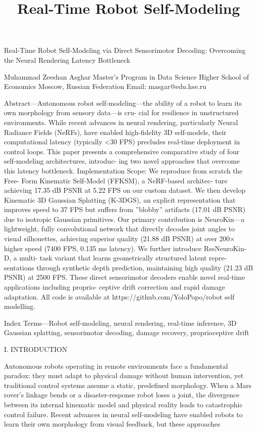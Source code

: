 \documentclass[10pt,twocolumn,letterpaper]{article}
\begin{document}
\title{Real-Time Robot Self-Modeling}
\maketitle

Real-Time Robot Self-Modeling via Direct Sensorimotor Decoding: Overcoming the Neural Rendering Latency Bottleneck

Muhammad Zeeshan Asghar Master’s Program in Data Science Higher School of Economics Moscow, Russian Federation Email: masgar@edu.hse.ru

Abstract—Autonomous robot self-modeling—the ability of a robot to learn its own morphology from sensory data—is cru- cial for resilience in unstructured environments. While recent advances in neural rendering, particularly Neural Radiance Fields (NeRFs), have enabled high-fidelity 3D self-models, their computational latency (typically <30 FPS) precludes real-time deployment in control loops. This paper presents a comprehensive comparative study of four self-modeling architectures, introduc- ing two novel approaches that overcome this latency bottleneck. Implementation Scope: We reproduce from scratch the Free- Form Kinematic Self-Model (FFKSM), a NeRF-based architec- ture achieving 17.35 dB PSNR at 5.22 FPS on our custom dataset. We then develop Kinematic 3D Gaussian Splatting (K-3DGS), an explicit representation that improves speed to 37 FPS but suffers from ”blobby” artifacts (17.01 dB PSNR) due to isotropic Gaussian primitives. Our primary contribution is NeuroKin—a lightweight, fully convolutional network that directly decodes joint angles to visual silhouettes, achieving superior quality (21.88 dB PSNR) at over 200× higher speed (7400 FPS, 0.135 ms latency). We further introduce ResNeuroKin-D, a multi- task variant that learns geometrically structured latent repre- sentations through synthetic depth prediction, maintaining high quality (21.23 dB PSNR) at 2500 FPS. These direct sensorimotor decoders enable novel real-time applications including proprio- ceptive drift correction and rapid damage adaptation. All code is available at https://github.com/YoloPopo/robot self modelling.

Index Terms—Robot self-modeling, neural rendering, real-time inference, 3D Gaussian splatting, sensorimotor decoding, damage recovery, proprioceptive drift

I. INTRODUCTION

Autonomous robots operating in remote environments face a fundamental paradox: they must adapt to physical damage without human intervention, yet traditional control systems assume a static, predefined morphology. When a Mars rover’s linkage bends or a disaster-response robot loses a joint, the divergence between its internal kinematic model and physical reality leads to catastrophic control failure. Recent advances in neural self-modeling have enabled robots to learn their own morphology from visual feedback, but these approaches
\end{document}
